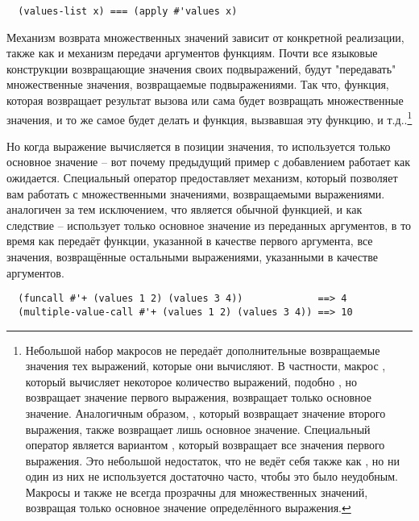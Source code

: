 \begin{verbatim}
  (values-list x) === (apply #'values x)
\end{verbatim}

Механизм возврата множественных значений зависит от конкретной реализации, также как и
механизм передачи аргументов функциям.  Почти все языковые конструкции возвращающие
значения своих подвыражений, будут "передавать" множественные значения, возвращаемые
подвыражениями.  Так что, функция, которая возвращает результат вызова  или
 сама будет возвращать множественные значения, и то же самое будет
делать и функция, вызвавшая эту функцию, и т.д..\footnote{Небольшой набор макросов не
  передаёт дополнительные возвращаемые значения тех выражений, которые они вычисляют.  В
  частности, макрос , который вычисляет некоторое количество выражений,
  подобно , но возвращает значение первого выражения, возвращает только
  основное значение.  Аналогичным образом, , который возвращает значение
  второго выражения, также возвращает лишь основное значение.  Специальный оператор
   является вариантом , который возвращает все
  значения первого выражения.  Это небольшой недостаток, что  не ведёт себя
  также как , но ни один из них не используется достаточно
  часто, чтобы это было неудобным.  Макросы  и  также не всегда
  прозрачны для множественных значений, возвращая только основное значение определённого
  выражения.}

Но когда выражение вычисляется в позиции значения, то используется только основное
значение -- вот почему предыдущий пример с добавлением работает как ожидается. Специальный
оператор  предоставляет механизм, который позволяет вам работать
с множественными значениями, возвращаемыми выражениями. 
аналогичен  за тем исключением, что  является обычной
функцией, и как следствие -- использует только основное значение из переданных аргументов,
в то время как  передаёт функции, указанной в качестве первого
аргумента, все значения, возвращённые остальными выражениями, указанными в качестве
аргументов.

\begin{verbatim}
  (funcall #'+ (values 1 2) (values 3 4))             ==> 4
  (multiple-value-call #'+ (values 1 2) (values 3 4)) ==> 10
\end{verbatim}

